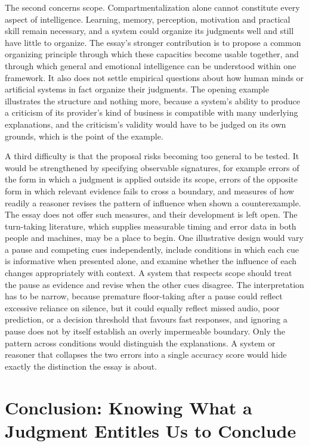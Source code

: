 \documentclass[12pt, a4paper]{article}
\begin{document}
The second concerns scope. Compartmentalization alone cannot constitute every aspect of intelligence. Learning, memory, perception, motivation and practical skill remain necessary, and a system could organize its judgments well and still have little to organize. The essay's stronger contribution is to propose a common organizing principle through which these capacities become usable together, and through which general and emotional intelligence can be understood within one framework. It also does not settle empirical questions about how human minds or artificial systems in fact organize their judgments. The opening example illustrates the structure and nothing more, because a system's ability to produce a criticism of its provider's kind of business is compatible with many underlying explanations, and the criticism's validity would have to be judged on its own grounds, which is the point of the example.

A third difficulty is that the proposal risks becoming too general to be tested. It would be strengthened by specifying observable signatures, for example errors of the form in which a judgment is applied outside its scope, errors of the opposite form in which relevant evidence fails to cross a boundary, and measures of how readily a reasoner revises the pattern of influence when shown a counterexample. The essay does not offer such measures, and their development is left open. The turn-taking literature, which supplies measurable timing and error data in both people and machines, may be a place to begin. One illustrative design would vary a pause and competing cues independently, include conditions in which each cue is informative when presented alone, and examine whether the influence of each changes appropriately with context. A system that respects scope should treat the pause as evidence and revise when the other cues disagree. The interpretation has to be narrow, because premature floor-taking after a pause could reflect excessive reliance on silence, but it could equally reflect missed audio, poor prediction, or a decision threshold that favours fast responses, and ignoring a pause does not by itself establish an overly impermeable boundary. Only the pattern across conditions would distinguish the explanations. A system or reasoner that collapses the two errors into a single accuracy score would hide exactly the distinction the essay is about.

\section{Conclusion: Knowing What a Judgment Entitles Us to Conclude}
\end{document}
